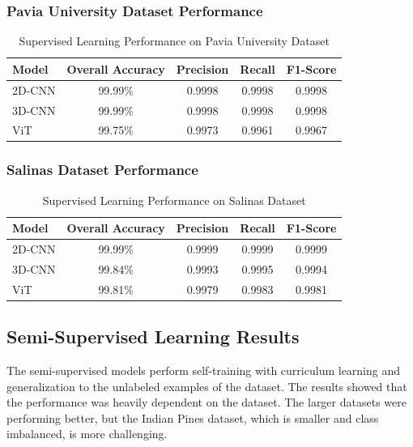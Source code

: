 \subsubsection{Pavia University Dataset Performance}
\begin{table}[H]
    \centering
    \caption{Supervised Learning Performance on Pavia University Dataset}
    \label{tab:supervised_pavia}
    \renewcommand{\arraystretch}{1.2}
    \begin{tabular}{|l|c|c|c|c|}
        \hline
        \textbf{Model} & \textbf{Overall Accuracy} & \textbf{Precision} & \textbf{Recall} & \textbf{F1-Score} \\ \hline
        2D-CNN & 99.99\% & 0.9998 & 0.9998 & 0.9998 \\ \hline
        3D-CNN & 99.99\% & 0.9998 & 0.9998 & 0.9998 \\ \hline
        ViT & 99.75\% & 0.9973 & 0.9961 & 0.9967 \\ \hline
    \end{tabular}
\end{table}

\subsubsection{Salinas Dataset Performance}
\begin{table}[H]
    \centering
    \caption{Supervised Learning Performance on Salinas Dataset}
    \label{tab:supervised_salinas}
    \renewcommand{\arraystretch}{1.2}
    \begin{tabular}{|l|c|c|c|c|}
        \hline
        \textbf{Model} & \textbf{Overall Accuracy} & \textbf{Precision} & \textbf{Recall} & \textbf{F1-Score} \\ \hline
        2D-CNN & 99.99\% & 0.9999 & 0.9999 & 0.9999 \\ \hline
        3D-CNN & 99.84\% & 0.9993 & 0.9995 & 0.9994 \\ \hline
        ViT & 99.81\% & 0.9979 & 0.9983 & 0.9981 \\ \hline
    \end{tabular}
\end{table}

\subsection{Semi-Supervised Learning Results}
The semi-supervised models perform self-training with curriculum learning and generalization to the unlabeled examples of the dataset. The results showed that the performance was heavily dependent on the dataset. The larger datasets were performing better, but the Indian Pines dataset, which is smaller and class imbalanced, is more challenging.

